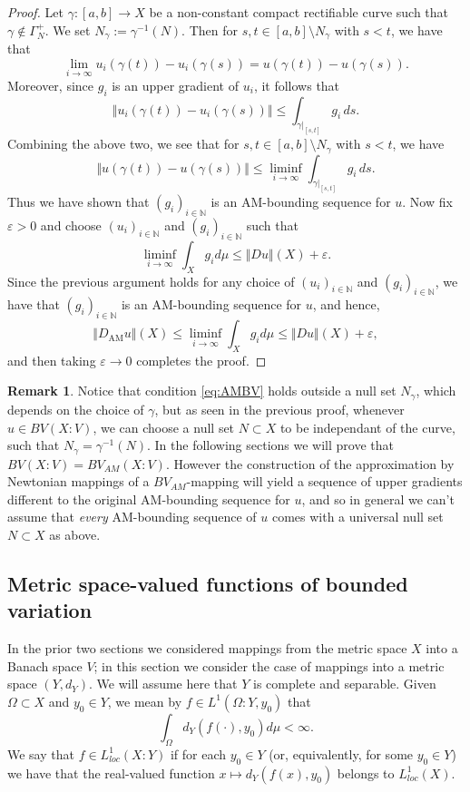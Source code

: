 \documentclass[11pt, letterpaper]{amsart} %
\newcommand*{\N}{{\mathbb N}}
\numberwithin{equation}{section}
\theoremstyle{plain}
\theoremstyle{definition}
\newtheorem{remark}[equation]{Remark}
\begin{document}
{\begin{proof}
Let $\gamma:[a,b]\to X$ be a 
non-constant compact rectifiable curve such that $\gamma\not\in\Gamma_N^+$. We set $N_\gamma:=\gamma^{-1}(N)$.
Then for $s,t\in[a,b]\setminus N_\gamma$ with $s<t$, we have that
\[
\lim_{i\to\infty}u_i(\gamma(t))-u_i(\gamma(s))=u(\gamma(t))-u(\gamma(s)).
\]
Moreover, since $g_i$ is an upper gradient of $u_i$, it follows that
\[
\Vert u_i(\gamma(t))-u_i(\gamma(s))\Vert\le \int_{\gamma\vert_{[s,t]}}g_i\, ds.
\]
Combining the above two, we see that 
for $s,t\in[a,b]\setminus N_\gamma$ with $s<t$, we have
\[
\Vert u(\gamma(t))-u(\gamma(s))\Vert\le \liminf_{i\to\infty}\int_{\gamma\vert_{[s,t]}}g_i\, ds.
\] 
Thus we have shown that $(g_i)_{i\in\N}$ is an AM-bounding sequence
for $u$. Now fix $\varepsilon >0$ and choose $(u_i)_{i\in\N}$ and $(g_i)_{i\in\N}$ such that 
$$\liminf_{i\to\infty}\int_Xg_id\mu\leq \Vert Du\Vert (X)+\varepsilon .$$
Since the previous argument holds for any choice of $(u_i)_{i\in\N}$ and $(g_i)_{i\in\N}$, we have that $(g_i)_{i\in\N}$ 
is an AM-bounding sequence for $u$, and hence,
\[
\Vert D_\mathrm{AM}u\Vert(X)\leq \liminf_{i\to\infty}\int_Xg_id\mu \leq \Vert Du\Vert (X) +\varepsilon,
\]
and then taking $\varepsilon\to 0$ completes the proof.
\end{proof}

\begin{remark}
Notice that condition \eqref{eq:AMBV} holds outside a null set $N_\gamma$, which
depends on the choice of $\gamma$, but as 
seen in the previous proof, whenever $u\in BV(X:V)$, we can choose a null set $N\subset X$ to be 
independant of the curve, such that $N_\gamma=\gamma^{-1}(N)$. 
In the following sections we will prove that $BV(X:V)=BV_{AM}(X:V)$.
However the construction of the 
approximation by Newtonian mappings of a $BV_{AM}$-mapping will yield a sequence of upper gradients 
different to the original AM-bounding sequence for $u$, and so in general we can't assume that \emph{every} 
AM-bounding sequence of $u$ comes with a universal null set $N\subset X$ as above. 
\end{remark}


\subsection{Metric space-valued functions of bounded variation}\label{Sec:MetricBV}

In the prior two sections we considered mappings from the metric space $X$ into a Banach space $V$; in this section we 
consider the case of mappings into a metric space $(Y,d_Y)$. We will assume here that $Y$ is complete and 
separable.  Given $\Omega\subset X$  and $y_0\in Y$, we mean by $f\in L^1(\Omega:Y,y_0)$
that 
\[
\int_\Omega d_Y(f(\cdot),y_0)d\mu<\infty.
\]
We say that $f\in L^1_{loc}(X:Y)$ if for each $y_0\in Y$ (or, equivalently, for some $y_0\in Y$)
we have that the real-valued function $x\mapsto d_Y(f(x),y_0)$ belongs to $L^1_{loc}(X)$.

}
\end{document}
